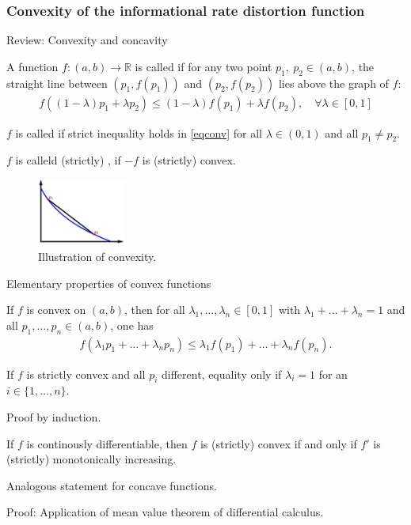 \subsubsection{Convexity of the informational rate distortion function}
\begin{frame}{Review: Convexity and concavity}
\bit
\item A function $f:(a,b)\to\mathbb{R}$ is called  if for any two point $p_1,\:p_2\in (a,b)$, the straight
line between $(p_1, f(p_1))$ and $(p_2, f(p_2))$ lies above the graph of $f$:
\begin{align}\label{eqconv}
f((1-\lambda)p_1+\lambda p_2)\leq (1-\lambda)f(p_1)+\lambda f(p_2), \quad \forall \lambda\in [0,1] 
\end{align}  
\item  $f$ is called  if strict inequality holds in \eqref{eqconv} for all $\lambda\in (0,1)$ and 
all $p_1\neq p_2$. 
\item $f$ is calleld (strictly) , if $-f$ is (strictly) convex. 
\eit
\begin{figure}
\includegraphics[width=0.26\textwidth]{RD_II/RD_Plot_Convex_Final.png}
\captionsetup{labelformat=empty}
\caption{Illustration of convexity.}
\end{figure}
\end{frame}

\begin{frame}{Elementary properties of convex functions}
\bit
\item If $f$ is convex on $(a,b)$, then for all $\lambda_1,\dots,\lambda_n\in[0,1]$ with $\lambda_1+\dots+\lambda_n=1$ and all 
$p_1,\dots,p_n\in (a,b)$, one has
\begin{align*}
f(\lambda_1 p_1+\dots+\lambda_np_n)\leq \lambda_1f(p_1)+\dots+\lambda_nf(p_n). 
\end{align*}
\item If $f$ is strictly convex and all $p_i$ different, equality only if $\lambda_i=1$ for an $i\in\{1,\dots,n\}$. 
\item Proof by induction.
\eit
{}
\bit
\item If $f$ is continously differentiable, then $f$ is (strictly) convex if and only if $f'$ is (strictly) monotonically increasing. 
\item Analogous statement for concave functions.  
\item Proof: Application of  mean value theorem of differential calculus.
\eit


\end{frame}

